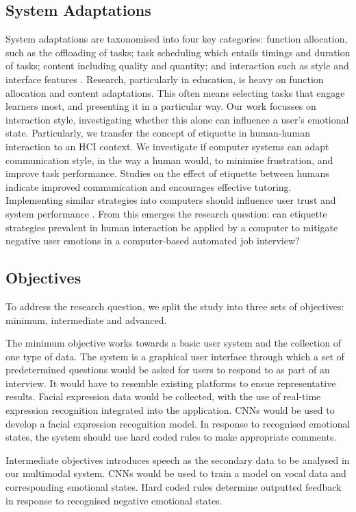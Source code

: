 \documentclass[12pt,a4paper]{article}
\begin{document}
\subsection{System Adaptations}
System adaptations are taxonomised into four key categories: function allocation, such as the offloading of tasks; task scheduling which entails timings and duration of tasks; content including quality and quantity; and interaction such as style and interface features \cite{feigh2012toward}. Research, particularly in education, is heavy on function allocation and content adaptations. This often means selecting tasks that engage learners most, and presenting it in a particular way. Our work focusses on interaction style, investigating whether this alone can influence a user's emotional state. Particularly, we transfer the concept of etiquette in human-human interaction to an HCI context. We investigate if computer systems can adapt communication style, in the way a human would, to minimise frustration, and improve task performance. Studies on the effect of etiquette between humans indicate improved communication and encourages effective tutoring. Implementing similar strategies into computers should influence user trust and system performance \cite{parasuraman2004trust}. From this emerges the research question: can etiquette strategies prevalent in human interaction be applied by a computer to mitigate negative user emotions in a computer-based automated job interview?

\subsection{Objectives}
To address the research question, we split the study into three sets of objectives: minimum, intermediate and advanced.

The minimum objective works towards a basic user system and the collection of one type of data. The system is a graphical user interface through which a set of predetermined questions would be asked for users to respond to as part of an interview. It would have to resemble existing platforms to ensue representative results. Facial expression data would be collected, with the use of real-time expression recognition integrated into the application. CNNs would be used to develop a facial expression recognition model. In response to recognised emotional states, the system should use hard coded rules to make appropriate comments.

Intermediate objectives introduces speech as the secondary data to be analysed in our multimodal system. CNNs would be used to train a model on vocal data and corresponding emotional states. Hard coded rules determine outputted feedback in response to recognised negative emotional states. 
\end{document}
